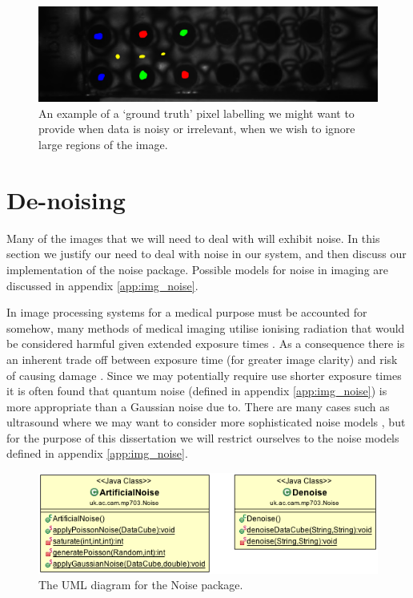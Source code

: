 \documentclass[12pt,twoside,notitlepage]{report}
\begin{document}
        \begin{figure}
            \centering
            \includegraphics[scale=0.2]{example_pixel_label_siri}
            \caption[An example of a noisy `ground truth' pixel labelling.]{An example of a `ground truth' pixel labelling we might want to provide when data is noisy or irrelevant, when we wish to ignore large regions of the image.} 
            \label{fig:non_perfect_labelling}
        \end{figure}






    \section{De-noising} \label{sec:de-noising}
        Many of the images that we will need to deal with will exhibit noise. In this section we justify our need to
        deal with noise in our system, and then discuss our implementation of the noise package. Possible models for 
        noise in imaging are discussed in appendix \ref{app:img_noise}. 

        In image processing systems for a medical purpose must be accounted for somehow, many methods 
        of medical imaging utilise ionising radiation that would be considered harmful given extended exposure times 
        \cite{picano2004sustainability}. As a consequence there is an inherent trade off between exposure time (for 
        greater image clarity) and risk of causing damage \cite{sprawls1987physical}. Since we may potentially 
        require use shorter exposure times it is often found that quantum noise (defined in appendix \ref{app:img_noise}) 
        is more appropriate than a Gaussian noise due to. There are many cases 
        such as ultrasound where we may want to consider more sophisticated noise models \cite{coupe2009nonlocal}, 
        but for the purpose of this dissertation we will restrict ourselves to the noise models defined in appendix \ref{app:img_noise}. 

        \begin{figure}
            \centering
            \includegraphics[scale=0.5]{Noise_UML}
            \caption{The UML diagram for the Noise package.}
        \end{figure}
\end{document}
